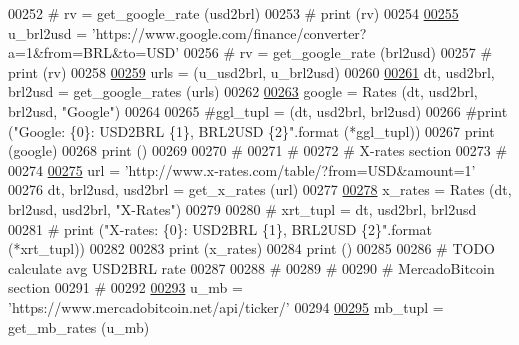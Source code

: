 \begin{DoxyCode}
00252 \textcolor{comment}{# rv = get\_google\_rate (usd2brl)}
00253 \textcolor{comment}{# print (rv)}
00254 
\hypertarget{raw__urlparser_8py_source.tex_l00255}{}\hyperlink{namespaceraw__urlparser_a876711ddd7ebb3991a35cc1768d1d22c}{00255} u\_brl2usd = \textcolor{stringliteral}{'https://www.google.com/finance/converter?a=1&from=BRL&to=USD'}
00256 \textcolor{comment}{# rv = get\_google\_rate (brl2usd)}
00257 \textcolor{comment}{# print (rv)}
00258 
\hypertarget{raw__urlparser_8py_source.tex_l00259}{}\hyperlink{namespaceraw__urlparser_aded92a1146e1ce1f14fd79a361f947f9}{00259} urls = (u\_usd2brl, u\_brl2usd)
00260 
\hypertarget{raw__urlparser_8py_source.tex_l00261}{}\hyperlink{namespaceraw__urlparser_adb724d2d0b7c561e8b0c53a42831efce}{00261} dt, usd2brl, brl2usd = get\_google\_rates (urls)
00262 
\hypertarget{raw__urlparser_8py_source.tex_l00263}{}\hyperlink{namespaceraw__urlparser_a1b812abf4fbbd8478dca91446c66b646}{00263} google = Rates (dt, usd2brl, brl2usd, \textcolor{stringliteral}{"Google"})
00264 
00265 \textcolor{comment}{#ggl\_tupl = (dt, usd2brl, brl2usd)}
00266 \textcolor{comment}{#print ("Google: \{0\}: USD2BRL \{1\}, BRL2USD \{2\}".format (*ggl\_tupl))}
00267 \textcolor{keywordflow}{print} (google)
00268 \textcolor{keywordflow}{print} ()
00269 
00270 \textcolor{comment}{#}
00271 \textcolor{comment}{#}
00272 \textcolor{comment}{# X-rates section }
00273 \textcolor{comment}{# }
00274 
\hypertarget{raw__urlparser_8py_source.tex_l00275}{}\hyperlink{namespaceraw__urlparser_a9242b893f4f49ef7cc0d4e599b70daa4}{00275} url = \textcolor{stringliteral}{'http://www.x-rates.com/table/?from=USD&amount=1'}
00276 dt, brl2usd, usd2brl = get\_x\_rates (url)
00277 
\hypertarget{raw__urlparser_8py_source.tex_l00278}{}\hyperlink{namespaceraw__urlparser_a76bac0500149c0b7dc5e8dfef56f05c3}{00278} x\_rates = Rates (dt, brl2usd, usd2brl, \textcolor{stringliteral}{"X-Rates"})
00279 
00280 \textcolor{comment}{# xrt\_tupl = dt, usd2brl, brl2usd}
00281 \textcolor{comment}{# print ("X-rates: \{0\}: USD2BRL \{1\}, BRL2USD \{2\}".format (*xrt\_tupl))}
00282 
00283 \textcolor{keywordflow}{print} (x\_rates)
00284 \textcolor{keywordflow}{print} ()
00285 
00286 \textcolor{comment}{# TODO calculate avg USD2BRL rate}
00287 
00288 \textcolor{comment}{#}
00289 \textcolor{comment}{#}
00290 \textcolor{comment}{# MercadoBitcoin section }
00291 \textcolor{comment}{# }
00292 
\hypertarget{raw__urlparser_8py_source.tex_l00293}{}\hyperlink{namespaceraw__urlparser_a9a840f174b92a24c415b88c87e84b73d}{00293} u\_mb = \textcolor{stringliteral}{'https://www.mercadobitcoin.net/api/ticker/'}
00294 
\hypertarget{raw__urlparser_8py_source.tex_l00295}{}\hyperlink{namespaceraw__urlparser_a5d09c5bd4390610ba67d1278a9c66b88}{00295} mb\_tupl = get\_mb\_rates (u\_mb)

\end{DoxyCode}
